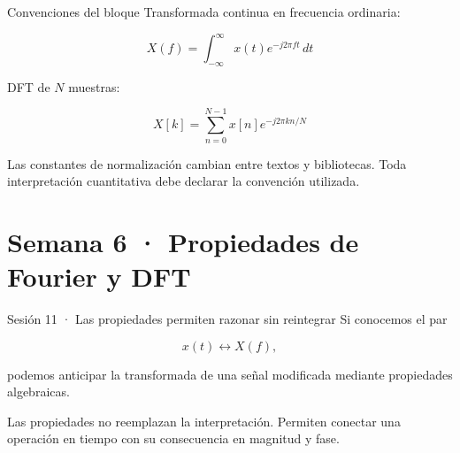 \documentclass[
  ignorenonframetext,
  aspectratio=169,
  spanish,
]{beamer}
\providecommand{\faExclamation}{\faIcon{exclamation}}
\begin{document}
\begin{frame}{Convenciones del bloque}
  \protect{}\label{convenciones-del-bloque}
  Transformada continua en frecuencia ordinaria:

  \[X(f)=\int_{-\infty}^{\infty}x(t)e^{-j2\pi ft}\,dt\]

  DFT de \(N\) muestras:

  \[X[k]=\sum_{n=0}^{N-1}x[n]e^{-j2\pi kn/N}\]

  \begin{tcolorbox}[enhanced jigsaw, arc=.35mm, bottomrule=.15mm, bottomtitle=1mm, breakable, colback=white, colbacktitle=quarto-callout-warning-color!10!white, colframe=quarto-callout-warning-color-frame, coltitle=black, left=2mm, leftrule=.75mm, opacityback=0, opacitybacktitle=0.6, rightrule=.15mm, title=\textcolor{quarto-callout-warning-color}{\faExclamationTriangle}\hspace{0.5em}{Advertencia}, titlerule=0mm, toprule=.15mm, toptitle=1mm]

    Las constantes de normalización cambian entre textos y bibliotecas. Toda
    interpretación cuantitativa debe declarar la convención utilizada.

  \end{tcolorbox}
\end{frame}

\section{Semana 6 · Propiedades de Fourier y
  DFT}\label{semana-6-propiedades-de-fourier-y-dft}

\begin{frame}{Sesión 11 · Las propiedades permiten razonar sin
    reintegrar}
  \protect{}\label{sesiuxf3n-11-las-propiedades-permiten-razonar-sin-reintegrar}
  Si conocemos el par

  \[x(t)\longleftrightarrow X(f),\]

  podemos anticipar la transformada de una señal modificada mediante
  propiedades algebraicas.

  \begin{tcolorbox}[enhanced jigsaw, arc=.35mm, bottomrule=.15mm, bottomtitle=1mm, breakable, colback=white, colbacktitle=quarto-callout-important-color!10!white, colframe=quarto-callout-important-color-frame, coltitle=black, left=2mm, leftrule=.75mm, opacityback=0, opacitybacktitle=0.6, rightrule=.15mm, title=\textcolor{quarto-callout-important-color}{\faExclamation}\hspace{0.5em}{Propósito}, titlerule=0mm, toprule=.15mm, toptitle=1mm]

    Las propiedades no reemplazan la interpretación. Permiten conectar una
    operación en tiempo con su consecuencia en magnitud y fase.

  \end{tcolorbox}
\end{frame}
\end{document}
